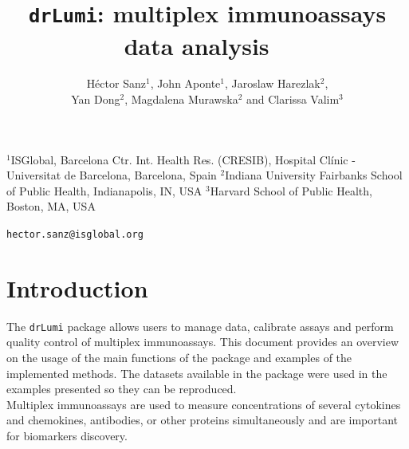 \documentclass[11pt]{article}\usepackage[]{graphicx}\usepackage[]{color}
\begin{document}


\title{\Large \bf {\tt drLumi}: multiplex immunoassays data 
analysis \ \vspace{0.5cm}}

\author{ H\'ector Sanz$^{1}$, John Aponte$^{1}$, Jaroslaw Harezlak$^{2}$, \\ 
Yan Dong$^{2}$, Magdalena Murawska$^{2}$ and Clarissa Valim$^{3}$}


\maketitle

\begin{scriptsize}
\noindent $^{1}$ISGlobal, Barcelona Ctr. Int. Health Res. (CRESIB), 
Hospital Cl\'inic - Universitat de Barcelona, Barcelona, Spain\newline
$^{2}$Indiana University Fairbanks School of Public Health, Indianapolis, IN, 
USA \newline
$^{3}$Harvard School of Public Health, Boston, MA, USA
\end{scriptsize} 


\begin{center}
\texttt{hector.sanz@isglobal.org}
\end{center}

\vspace{0.5cm}

\tableofcontents


\newpage
\section{Introduction} 

The {\tt drLumi} package allows users to manage data, calibrate assays and 
perform quality control of multiplex immunoassays. This document provides an
overview on the usage of the main functions of the package and examples
of the implemented methods. The datasets available in the package were used 
in the examples presented so they can be reproduced.\\


\noindent Multiplex immunoassays are used to measure concentrations of several cytokines and chemokines, antibodies, or other proteins simultaneously and are important for biomarkers discovery.\\
\end{document}
